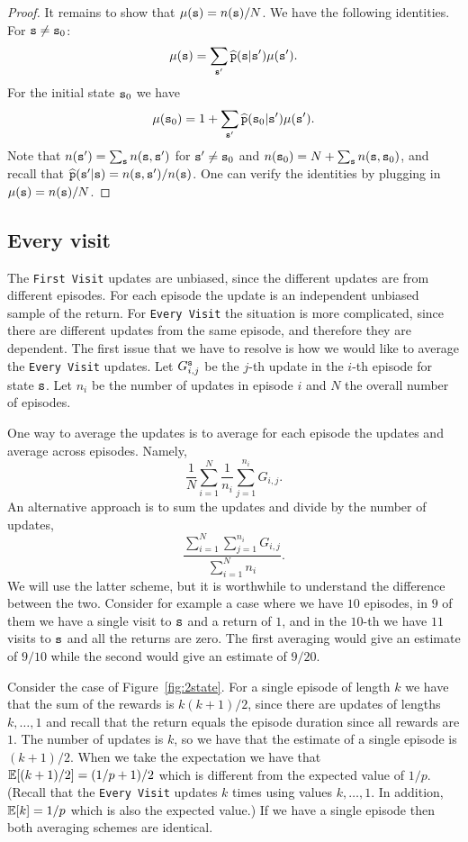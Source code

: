 \begin{advanced}
\begin{proof}
It remains to show that $\mu({\tt s})=n({\tt s})/N$. We have the
following identities. For ${\tt s}\neq {\tt s}_0$:
\[
\mu({\tt s})=\sum_{{\tt s}'} \widehat{{\tt p}}({\tt s}|{\tt s}')\mu({\tt s}').
\]
For the initial state ${\tt s}_0$ we have
\[
\mu({\tt s}_0)=1+ \sum_{{\tt s}'} \widehat{{\tt p}}({\tt s}_0|{\tt s}')\mu({\tt s}').
\]
Note that $n({\tt s}')=\sum_{{\tt s}} n({\tt s},{\tt s}')$ for ${\tt s}' \neq {\tt s}_0$ and
$n({\tt s}_0)=N+\sum_{{\tt s}} n({\tt s},{\tt s}_0)$, and recall that
$\widehat{{\tt p}}({\tt s}'|{\tt s})=n({\tt s},{\tt s}')/n({\tt s})$. One can verify the identities by
plugging in $\mu({\tt s})=n({\tt s})/N$.
\end{proof}

\subsection{Every visit}

The {\tt First Visit} updates are unbiased, since the different
updates are from different episodes. For each episode the update is
an independent unbiased sample of the return.
%
For {\tt Every Visit} the situation is more complicated, since there
are different updates from the same episode, and therefore they are
dependent. The first issue that we have to resolve is how we would like
to average the {\tt Every Visit} updates. Let $G^{\tt s}_{i,j}$
be the $j$-th update in the $i$-th episode for state ${\tt s}$. Let
$n_i$ be the number of updates in episode $i$ and $N$ the overall
number of episodes.

One way to average the updates is to average for each episode the
updates and average across episodes. Namely,
\[
\frac{1}{N}\sum_{i=1}^N \frac{1}{n_i} \sum_{j=1}^{n_i} G_{i,j}.
\]
An alternative approach is to sum the updates and divide by the
number of updates,
\[
\frac{\sum_{i=1}^N\sum_{j=1}^{n_i} G_{i,j}}{\sum_{i=1}^N n_i}.
\]
We will use the latter scheme, but it is worthwhile to understand
the difference between the two. Consider for example a case where 
we have $10$ episodes, in $9$ of them we have a single visit to ${\tt s}$ and
a return of $1$, and in the $10$-th we have $11$ visits to ${\tt s}$
and all the returns are zero. The first averaging would give an
estimate of $9/10$ while the second would give an estimate of
$9/20$.

Consider the case of Figure~\ref{fig:2state}. For a single episode
of length $k$ we have that the sum of the rewards is $k(k+1)/2$,
since there are updates of lengths $k, \ldots , 1$ and recall that
the return equals the episode duration since all rewards are $1$. The number
of updates is $k$, so we have that the estimate of a single episode
is $(k+1)/2$. When we take the expectation we have that
$\mathbb{E}[(k+1)/2]=(1/p+1)/2$ which is different from the expected value of
$1/p$. (Recall that the {\tt Every Visit} updates $k$ times using
values $k,\ldots,1$. In addition, $\mathbb{E}[k]=1/p$ which is also the
expected value.) If we have a single episode then both averaging
schemes are identical.


\end{advanced}
